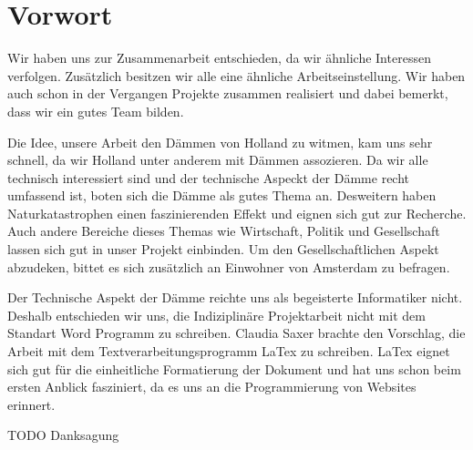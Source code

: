 \part{Vorwort}



Wir haben uns zur Zusammenarbeit entschieden, da wir ähnliche Interessen verfolgen.
Zusätzlich besitzen wir alle eine ähnliche Arbeitseinstellung. 
Wir haben auch schon in der Vergangen Projekte zusammen realisiert und dabei bemerkt, dass wir ein gutes Team bilden.
 
Die Idee, unsere Arbeit den Dämmen von Holland zu witmen, kam uns sehr schnell, da wir Holland unter anderem mit Dämmen assozieren.
Da wir alle technisch interessiert sind und der technische Aspeckt der Dämme recht umfassend ist, boten sich die Dämme als gutes Thema an. 
Desweitern haben Naturkatastrophen einen faszinierenden Effekt und eignen sich gut zur Recherche.
Auch andere Bereiche dieses Themas wie Wirtschaft, Politik und Gesellschaft lassen sich gut in unser Projekt einbinden. 
Um den Gesellschaftlichen Aspekt abzudeken, bittet es sich zusätzlich an Einwohner von Amsterdam zu befragen.

Der Technische Aspekt der Dämme reichte uns als begeisterte Informatiker nicht. Deshalb entschieden wir uns, die Indiziplinäre 
Projektarbeit nicht mit dem Standart Word Programm zu schreiben. Claudia Saxer brachte den Vorschlag, die Arbeit mit dem Textverarbeitungsprogramm
LaTex zu schreiben. 
LaTex eignet sich gut für die einheitliche Formatierung der Dokument und hat uns schon beim ersten Anblick fasziniert, da es uns an die 
Programmierung  von Websites erinnert.


TODO
Danksagung
